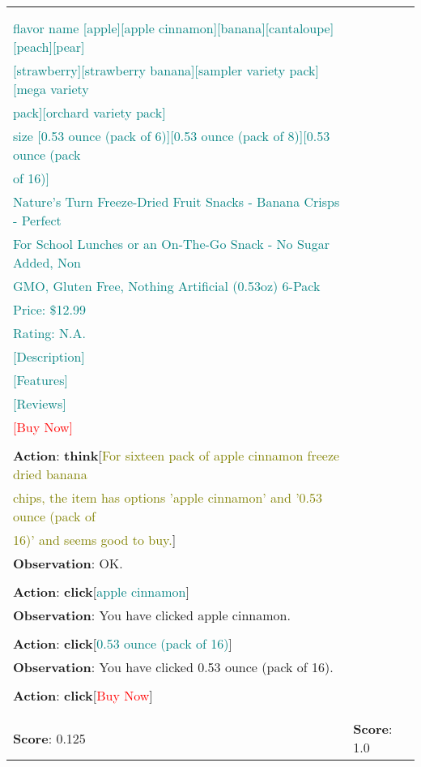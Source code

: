 \begin{table}[H]
\begin{tabular}{l|l}
{\textcolor{red}{} \\
\textcolor{red}{} \\
\textcolor{teal}{
flavor name [apple][apple cinnamon][banana][cantaloupe][peach][pear]}\\ \textcolor{teal}{[strawberry][strawberry banana][sampler variety pack][mega variety}\\ \textcolor{teal}{pack][orchard variety pack]
}\\
\textcolor{teal}{
size [0.53 ounce (pack of 6)][0.53 ounce (pack of 8)][0.53 ounce (pack}\\  \textcolor{teal}{of 16)]
}\\
\textcolor{teal}{
Nature’s Turn Freeze-Dried Fruit Snacks - Banana Crisps - Perfect}\\ \textcolor{teal}{For School Lunches or an On-The-Go Snack - No Sugar Added, Non}\\ \textcolor{teal}{ GMO, Gluten Free, Nothing Artificial (0.53oz) 6-Pack 
}\\
\textcolor{teal}{Price: \$12.99}\\
\textcolor{teal}{Rating: N.A.}\\
\textcolor{teal}{[Description]}\\
\textcolor{teal}{[Features]}\\
\textcolor{teal}{[Reviews]}\\
\textcolor{red}{[Buy Now]}\\
\\
\textbf{Action}: \textbf{think}[\textcolor{olive}{For sixteen pack of apple cinnamon freeze dried banana}\\ \textcolor{olive}{chips, the item has options 'apple cinnamon' and '0.53 ounce (pack of}\\ \textcolor{olive}{16)' and seems good to buy.}]\\
\textbf{Observation}: OK.\\
\\
\textbf{Action}: \textbf{click}[\textcolor{teal}{apple cinnamon}]\\
\textbf{Observation}: You have clicked apple cinnamon.\\
\\
\textbf{Action}: \textbf{click}[\textcolor{teal}{0.53 ounce (pack of 16)}]\\
\textbf{Observation}: You have clicked 0.53 ounce (pack of 16).\\
\\
\textbf{Action}: \textbf{click}[\textcolor{red}{Buy Now}]\\
} \\ \\ \hline

\textbf{Score}: 0.125 & \textbf{Score}: 1.0\\
\bottomrule

\end{tabular}

\end{table}
